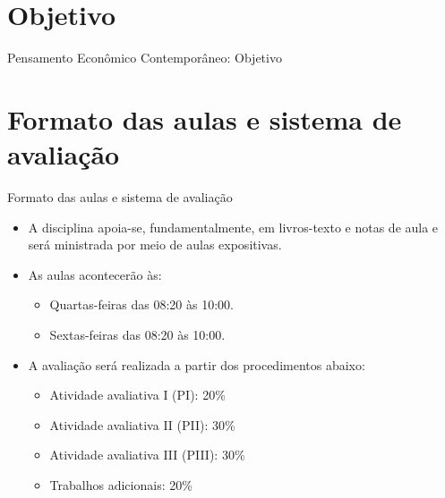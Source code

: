 \documentclass[10pt]{beamer}
\begin{document}
\section{Objetivo}
\begin{frame}{Pensamento Econômico Contemporâneo: Objetivo}
    \begin{center}
        \begin{minipage}{.8\textwidth}
        \end{minipage}
    \end{center}
\end{frame}

\section{Formato das aulas e sistema de avaliação}
\begin{frame}{Formato das aulas e sistema de avaliação}
    \begin{itemize}
        \item A disciplina apoia-se, fundamentalmente, em livros-texto e notas de aula e será ministrada por meio de aulas expositivas.\bigskip

        \item As aulas acontecerão às:\medskip
              \begin{itemize}
                  \item Quartas-feiras das 08:20 às 10:00.\medskip
                  \item Sextas-feiras das 08:20 às 10:00.\bigskip
              \end{itemize}

        \item A avaliação será realizada a partir dos procedimentos abaixo:\medskip
              \begin{itemize}
                  \item Atividade avaliativa I (PI): 20\%\medskip
                  \item Atividade avaliativa II (PII): 30\%\medskip
                  \item Atividade avaliativa III (PIII): 30\%\medskip
                  \item Trabalhos adicionais: 20\%
              \end{itemize}
    \end{itemize}
\end{frame}
\end{document}
